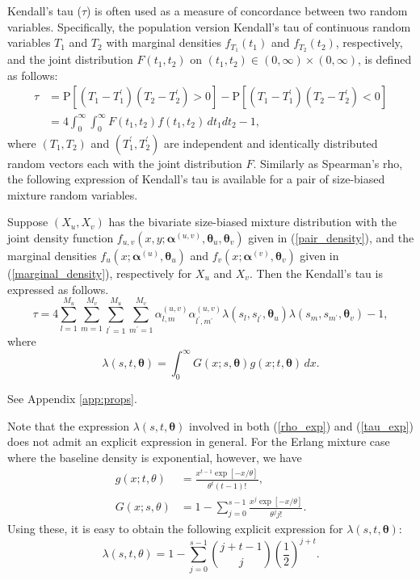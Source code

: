 \documentclass[eng]{csam}
\def\a{\alpha}
\def\mP{\text{P}}
\begin{document}
Kendall's tau ($\tau$) is often used as a measure of concordance between two random variables. Specifically, the population version Kendall's tau of continuous random variables $T_1$ and $T_2$ with marginal densities $f_{T_1}(t_1)$ and $f_{T_2}(t_2)$, respectively, and the joint distribution $F(t_1, t_2)$ on $(t_1, t_2) \in (0, \infty)\times (0, \infty)$, is defined as follows:
\begin{align}
\tau &= \mP[(T_1-T_1^{\prime})(T_2 - T_2^{\prime}) > 0] - \mP[(T_1-T_1^{\prime})(T_2 - T_2^{\prime}) < 0] \nonumber\\
&= 4 \int_{0}^{\infty}\int_{0}^{\infty} F(t_1, t_2) f(t_1, t_2)\,dt_1 dt_2 - 1, \label{def:tau}
\end{align}
where $(T_1, T_2)$ and $(T_1^{\prime}, T_2^{\prime})$ are independent and identically distributed random vectors each with the joint distribution $F$. Similarly as Spearman's rho, the following expression of Kendall's tau is available for a pair of size-biased mixture random variables.

\begin{proposition}\label{prop:tau}
Suppose $(X_u, X_v)$ has the bivariate size-biased mixture distribution with the joint density function $f_{u,v}(x, y; \bm{\a}^{(u,v)}, \bm{\theta}_u, \bm{\theta}_v)$ given in (\ref{pair_density}), and the marginal densities $f_u(x; \bm{\a}^{(u)}, \bm{\theta}_u)$ and $f_v(x; \bm{\a}^{(v)}, \bm{\theta}_v)$ given in (\ref{marginal_density}), respectively for $X_u$ and $X_v$. Then the Kendall's tau is expressed as follows.
\begin{equation}\label{tau_exp}
\tau = 4\sum_{l = 1}^{M_u}\sum_{m = 1}^{M_v} \sum_{l^\prime = 1}^{M_u}\sum_{m^\prime = 1}^{M_v} \a^{(u,v)}_{l,m} \a^{(u,v)}_{l^{\prime}, m^{\prime}} \lambda(s_l, s_{l^\prime}, \bm{\theta}_u)\lambda(s_m, s_{m^\prime}, \bm{\theta}_v) -1,
\end{equation}
where
\begin{equation*}
\lambda(s, t, \bm{\theta}) = \int_0^{\infty} G(x;s, \bm{\theta})g(x; t, \bm{\theta})\,dx.
\end{equation*}
\end{proposition}

 See Appendix \ref{app:props}.

\medskip
Note that the expression $\lambda(s, t, \bm{\theta})$ involved in both (\ref{rho_exp}) and (\ref{tau_exp}) does not admit an explicit expression in general. For the Erlang mixture case where the baseline density is exponential, however, we have
\begin{align*}
g(x; t, \theta) &= \frac{x^{t-1}\exp[-x/\theta]}{\theta^t (t-1)!},\\
G(x; s, \theta) &= 1- \sum_{j=0}^{s-1}\frac{x^j \exp[-x/\theta]}{\theta^j j!}.
\end{align*}
Using these, it is easy to obtain the following explicit expression for $\lambda(s, t, \bm{\theta})$:
\begin{equation}\label{lambda_erlang}
\lambda(s, t, \theta) = 1- \sum_{j=0}^{s-1}\binom{j+t-1}{j}\left(\frac{1}{2}\right)^{j+t}.
\end{equation}
\end{document}
